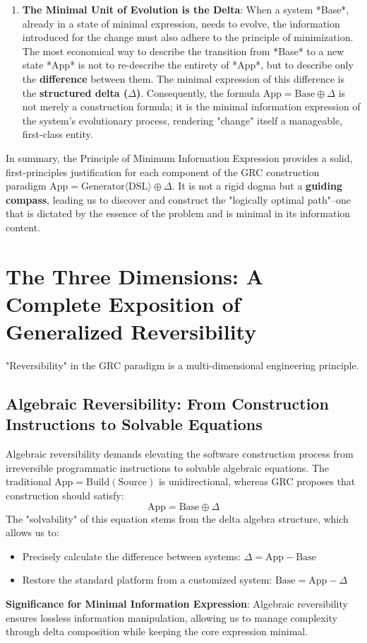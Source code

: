 \documentclass[11pt]{article}
\begin{document}
\begin{enumerate}
    \item \textbf{The Minimal Unit of Evolution is the Delta}: When a system *Base*, already in a state of minimal expression, needs to evolve, the information introduced for the change must also adhere to the principle of minimization. The most economical way to describe the transition from *Base* to a new state *App* is not to re-describe the entirety of *App*, but to describe only the \textbf{difference} between them. The minimal expression of this difference is the \textbf{structured delta ($\Delta$)}. Consequently, the formula $\text{App} = \text{Base} \oplus \Delta$ is not merely a construction formula; it is the minimal information expression of the system's evolutionary process, rendering "change" itself a manageable, first-class entity.
\end{enumerate}

In summary, the Principle of Minimum Information Expression provides a solid, first-principles justification for each component of the GRC construction paradigm $\text{App} = \text{Generator}\langle\text{DSL}\rangle \oplus \Delta$. It is not a rigid dogma but a \textbf{guiding compass}, leading us to discover and construct the "logically optimal path"--one that is dictated by the essence of the problem and is minimal in its information content.

\section{The Three Dimensions: A Complete Exposition of Generalized Reversibility}

"Reversibility" in the GRC paradigm is a multi-dimensional engineering principle.

\subsection{Algebraic Reversibility: From Construction Instructions to Solvable Equations}

Algebraic reversibility demands elevating the software construction process from irreversible programmatic instructions to solvable algebraic equations. The traditional $\text{App} = \text{Build}(\text{Source})$ is unidirectional, whereas GRC proposes that construction should satisfy:
\[
\text{App} = \text{Base} \oplus \Delta
\]
The "solvability" of this equation stems from the delta algebra structure, which allows us to:
\begin{itemize}
    \item Precisely calculate the difference between systems: $\Delta = \text{App} - \text{Base}$
    \item Restore the standard platform from a customized system: $\text{Base} = \text{App} - \Delta$
\end{itemize}
\textbf{Significance for Minimal Information Expression}: Algebraic reversibility ensures lossless information manipulation, allowing us to manage complexity through delta composition while keeping the core expression minimal.
\end{document}
